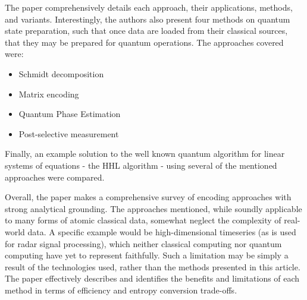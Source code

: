 The paper comprehensively details each approach, their applications, methods, and variants.
Interestingly, the authors also present four methods on quantum state preparation, such that once data are loaded from their classical sources, that they may be prepared for quantum operations.
The approaches covered were:

\begin{itemize}
 \item Schmidt decomposition
 \item Matrix encoding
 \item Quantum Phase Estimation
 \item Post-selective measurement
\end{itemize}

Finally, an example solution to the well known quantum algorithm for linear systems of equations - the HHL algorithm - using several of the mentioned approaches were compared.

Overall, the paper makes a comprehensive survey of encoding approaches with strong analytical grounding. The approaches mentioned, while soundly applicable to many forms of atomic classical data, somewhat neglect the complexity of real-world data. A specific example would be high-dimensional timeseries (as is used for radar signal processing), which neither classical computing nor quantum computing have yet to represent faithfully. Such a limitation may be simply a result of the technologies used, rather than the methods presented in this article. The paper effectively describes and identifies the benefits and limitations of each method in terms of efficiency and entropy conversion trade-offs.

